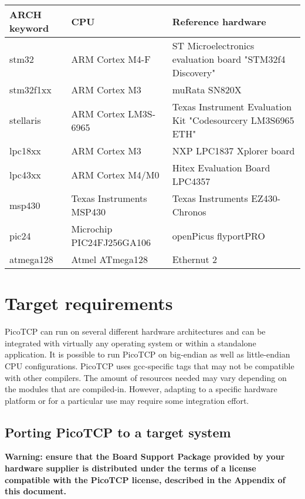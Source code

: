 \begin{longtable}{ | l | l | p{5cm} | }
\hline
{\bf ARCH keyword} &
{\bf CPU} &
{\bf Reference hardware}
\\ \hline

stm32&
ARM Cortex M4-F&
ST Microelectronics evaluation board "STM32f4 Discovery"
\\ \hline

stm32f1xx&
ARM Cortex M3&
muRata SN820X
\\ \hline

stellaris&
ARM Cortex LM3S-6965&
Texas Instrument Evaluation Kit "Codesourcery LM3S6965 ETH"
\\ \hline

lpc18xx&
ARM Cortex M3&
NXP LPC1837 Xplorer board
\\ \hline

lpc43xx&
ARM Cortex M4/M0&
Hitex Evaluation Board LPC4357 
\\ \hline

msp430&
Texas Instruments MSP430&
Texas Instruments EZ430-Chronos
\\ \hline

pic24&
Microchip PIC24FJ256GA106&
openPicus flyportPRO
\\ \hline

atmega128&
Atmel ATmega128&
Ethernut 2
\\ \hline

\end{longtable}



\section{Target requirements}
PicoTCP can run on several different hardware architectures and can be
integrated with virtually any operating system or within a standalone
application. It is possible to run PicoTCP on big-endian as well as
little-endian CPU configurations. PicoTCP uses gcc-specific tags that may
not be compatible with other compilers. The amount of resources needed
may vary depending on the modules that are compiled-in. However, adapting
to a specific hardware platform or for a particular use may require some
integration effort.

\subsection{Porting PicoTCP to a target system}

\begin{center}
\textbf{Warning: ensure that the Board Support Package provided by your
hardware supplier is distributed under the terms of a license compatible
with the PicoTCP license, described in the Appendix of this document.}
\end{center}

